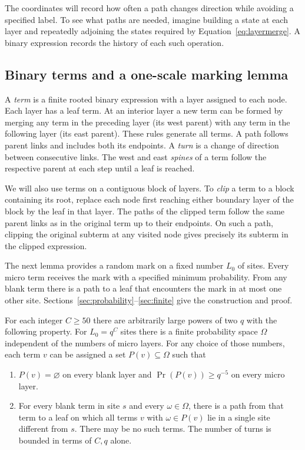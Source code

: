 The coordinates will record how often a path changes direction while
avoiding a specified label. To see what paths are needed, imagine
building a state at each layer and repeatedly adjoining the states
required by Equation~\eqref{eq:layermerge}. A binary expression
records the history of each such operation.

\subsection{Binary terms and a one-scale marking lemma}

A \emph{term} is a finite rooted binary expression with a layer
assigned to each node. Each layer has a leaf term. At an interior
layer a new term can be formed by merging any term in the preceding
layer (its west parent) with any term in the following layer (its
east parent). These rules generate all terms. A path follows parent
links and includes both its endpoints. A \emph{turn} is a change of
direction between consecutive links. The west and east \emph{spines}
of a term follow the respective parent at each step until a leaf is
reached.

We will also use terms on a contiguous block of layers. To \emph{clip}
a term to a block containing its root, replace each node first reaching
either boundary layer of the block by the leaf in that layer. The paths
of the clipped term follow the same parent links as in the original
term up to their endpoints. On such a path, clipping the original
subterm at any visited node gives precisely its subterm in the clipped
expression.

The next lemma provides a random mark on a fixed number \(L_0\) of
sites. Every micro term receives the mark with a specified minimum
probability. From any blank term there is a path to a leaf that
encounters the mark in at most one other site. Sections~\ref{sec:probability}--\ref{sec:finite}
give the construction and proof.

\begin{lemma}\label{lem:primary}
For each integer \(C\ge50\) there are arbitrarily large powers of two
\(q\) with the following property. For \(L_0=q^C\) sites there is a
finite probability space \(\Omega\) independent of the numbers of
micro layers. For any choice of those numbers, each term \(v\) can
be assigned a set \(P(v)\subseteq\Omega\) such that
\begin{enumerate}
\item \(P(v)=\varnothing\) on every blank layer and
\(\Pr(P(v))\ge q^{-5}\) on every micro layer.
\item For every blank term in site \(s\) and every \(\omega\in\Omega\),
there is a path from that term to a leaf on which all terms \(v\)
with \(\omega\in P(v)\) lie in a single site different from \(s\).
There may be no such terms. The number of turns is bounded in terms
of \(C,q\) alone.
\end{enumerate}
\end{lemma}

